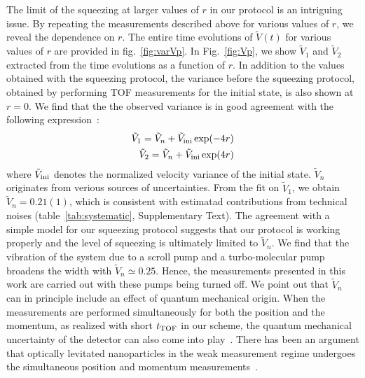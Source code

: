 \documentclass[aps, prl, 
amsmath, showpacs, preprintnumbers, twocolumn, amssymb, amsmath, superscriptaddress]{revtex4-1}
\begin{document}
The limit of the squeezing at larger values of $r$ in our protocol is an intriguing issue. By repeating the measurements described above for various values of $r$, we reveal the dependence on $r$. The entire time evolutions of $\tilde{V}(t)$ for various values of $r$ are provided in fig.~\ref{fig:varVp}.  In Fig.~\ref{fig:Vp}, we show $\tilde{V}_{1}$ and $\tilde{V}_{2}$ extracted from the time evolutions as a function of $r$. In addition to the values obtained with the squeezing protocol, the variance before the squeezing protocol, obtained by performing TOF measurements for the initial state, is also shown at $r=0$. We find that the the observed variance is in good agreement with the following expression~\cite{fnote10,xin2021rapid,rossi2024quantum}:
\begin{eqnarray}
\tilde{V}_{1} = \tilde{V}_n+\tilde{V}_{\rm ini} \exp(-4r) \\
\tilde{V}_{2} = \tilde{V}_n+\tilde{V}_{\rm ini} \exp(4r)
\label{eq:vp0}
\end{eqnarray} 
where $\tilde{V}_{\rm ini}$ denotes the normalized velocity variance of the initial state. $\tilde{V}_n$ originates from verious sources of uncertainties. From the fit on $\tilde{V}_{1}$, we obtain $\tilde{V}_n=0.21(1)$, which is consistent with estimatad contributions from technical noises (table~\ref{tab:systematic}, Supplementary Text). The agreement with a simple model for our squeezing protocol suggests that our protocol is working properly and the level of squeezing is ultimately limited to $\tilde{V}_n$. We find that the vibration of the system due to a scroll pump and a turbo-molecular pump broadens the width with $\tilde{V}_n \simeq 0.25$. Hence, the measurements presented in this work are carried out with these pumps being turned off. We point out that $\tilde{V}_n$ can in principle include an effect of quantum mechanical origin. When the measurements are performed simultaneously for both the position and the momentum, as realized with short $t_{\rm TOF}$ in our scheme, the quantum mechanical uncertainty of the detector can also come into play~\cite{arthurs1965bstj,yamamoto1986preparation,arthurs1988quantum}. There has been an argument that optically levitated nanoparticles in the weak measurement regime undergoes the simultaneous position and momentum measurements~\cite{rossi2024quantum}. 
\end{document}
